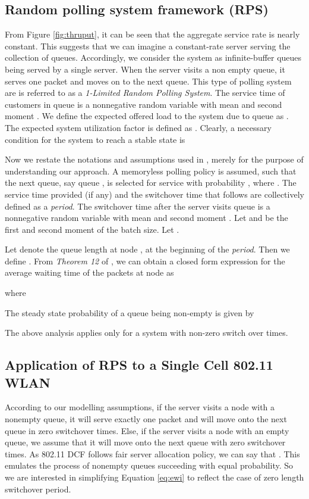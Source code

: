 \documentclass[10pt, conference, compsocconf]{IEEEtran}
\begin{document}
\subsection{Random polling system framework (RPS)}
From Figure \ref{fig:thruput}, it can be seen that the aggregate service rate is nearly constant. This suggests that we can imagine a constant-rate server serving the collection of queues. Accordingly, we consider the system as  infinite-buffer queues being served by a single server. When the server visits a non empty queue, it serves one packet and moves on to the next queue. This type of polling system are is referred to as a \emph{1-Limited Random Polling System}. The service time of customers in queue  is a nonnegative random variable with mean  and second moment . We define the expected offered load to the system due to queue  as . The expected system utilization factor is defined as . Clearly, a necessary condition for the system to reach a stable state is 
 

Now we restate the notations and assumptions used in \cite{lee}, merely for the purpose of understanding our approach. A memoryless polling policy is assumed, such that the next queue, say queue , is selected for service with probability , where . The service time provided (if any) and the switchover time that follows are collectively defined as a \emph{period}. The switchover time after the server visits queue  is a nonnegative random variable with mean  and second moment . Let  and  be the first and second moment of the batch size. Let .

Let  denote the queue length at node , at the beginning of the  \emph{period}. Then we define . From \textit{Theorem 12} of \cite{lee}, we can obtain a closed form expression for the average waiting time of the packets at node  as

where

The steady state probability of a queue being non-empty is given by

The above analysis applies only for a system with non-zero switch over times. 

\subsection{Application of RPS to a Single Cell 802.11 WLAN}
According to our modelling assumptions, if the server visits a node with a nonempty queue, it will serve exactly one packet and will move onto the next queue in zero switchover times. Else, if the server visits a node with an empty queue, we assume that it will move onto the next queue with zero switchover times. As 802.11 DCF follows fair server allocation policy, we can say that . This emulates the process of nonempty queues succeeding with equal probability. So we are interested in simplifying Equation \eqref{eq:ewi} to reflect the case of zero length switchover period. 
\end{document}
